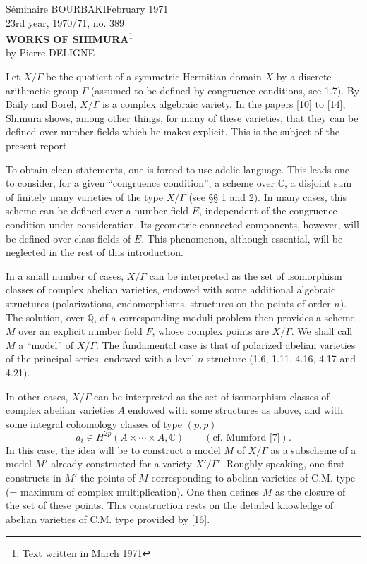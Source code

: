 \documentclass[10pt]{article}
\newcommand{\C}{\mathbb C}
\newcommand{\Q}{\mathbb Q}
\begin{document}
\begin{center}
Séminaire BOURBAKI\hfill February 1971\\
23rd year, 1970/71, no. 389\\[2.2em]
{\Large\bfseries WORKS OF SHIMURA}\footnote{Text written in March 1971}\\[1.2em]
by Pierre DELIGNE
\end{center}

Let $X/\Gamma$ be the quotient of a symmetric Hermitian domain $X$ by a discrete arithmetic group $\Gamma$ (assumed to be defined by congruence conditions, see 1.7). By Baily and Borel, $X/\Gamma$ is a complex algebraic variety. In the papers [10] to [14], Shimura shows, among other things, for many of these varieties, that they can be defined over number fields which he makes explicit. This is the subject of the present report.

To obtain clean statements, one is forced to use adelic language. This leads one to consider, for a given ``congruence condition'', a scheme over $\C$, a disjoint sum of finitely many varieties of the type $X/\Gamma$ (see §§ 1 and 2). In many cases, this scheme can be defined over a number field $E$, independent of the congruence condition under consideration. Its geometric connected components, however, will be defined over class fields of $E$. This phenomenon, although essential, will be neglected in the rest of this introduction.

In a small number of cases, $X/\Gamma$ can be interpreted as the set of isomorphism classes of complex abelian varieties, endowed with some additional algebraic structures (polarizations, endomorphisms, structures on the points of order $n$). The solution, over $\Q$, of a corresponding moduli problem then provides a scheme $M$ over an explicit number field $F$, whose complex points are $X/\Gamma$. We shall call $M$ a ``model'' of $X/\Gamma$. The fundamental case is that of polarized abelian varieties of the principal series, endowed with a level-$n$ structure (1.6, 1.11, 4.16, 4.17 and 4.21).

In other cases, $X/\Gamma$ can be interpreted as the set of isomorphism classes of complex abelian varieties $A$ endowed with some structures as above, and with some integral cohomology classes of type $(p,p)$
\[
a_i\in H^{2p}(A\times\cdots\times A,\C) \qquad (\text{cf. Mumford [7]}).
\]
In this case, the idea will be to construct a model $M$ of $X/\Gamma$ as a subscheme of a model $M'$ already constructed for a variety $X'/\Gamma'$. Roughly speaking, one first constructs in $M'$ the points of $M$ corresponding to abelian varieties of C.M. type (= maximum of complex multiplication). One then defines $M$ as the closure of the set of these points. This construction rests on the detailed knowledge of abelian varieties of C.M. type provided by [16].
\end{document}
